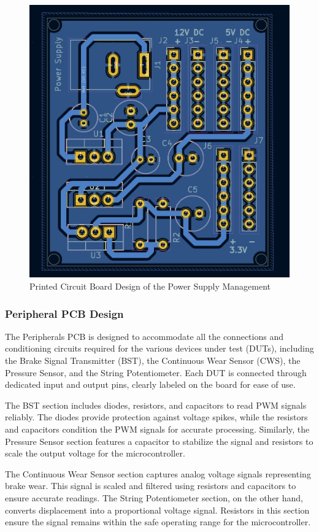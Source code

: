\documentclass[12pt]{article}
\begin{document}
\begin{figure}[H]
  \includegraphics[width=\textwidth]{../assets/pcb/image6.jpg}
  \caption{Printed Circuit Board Design of the Power Supply Management}
\end{figure}
\subsubsection*{Peripheral PCB Design}
The Peripherals PCB is designed to accommodate all the connections and
conditioning circuits required for the various devices under test (DUTs),
including the Brake Signal Transmitter (BST), the Continuous Wear Sensor (CWS),
the Pressure Sensor, and the String Potentiometer. Each DUT is connected
through dedicated input and output pins, clearly labeled on the board for ease
of use.

The BST section includes diodes, resistors, and capacitors to read PWM signals
reliably. The diodes provide protection against voltage spikes, while the
resistors and capacitors condition the PWM signals for accurate processing.
Similarly, the Pressure Sensor section features a capacitor to stabilize the
signal and resistors to scale the output voltage for the microcontroller.

The Continuous Wear Sensor section captures analog voltage signals representing
brake wear. This signal is scaled and filtered using resistors and capacitors
to ensure accurate readings. The String Potentiometer section, on the other
hand, converts displacement into a proportional voltage signal. Resistors in
this section ensure the signal remains within the safe operating range for the
microcontroller.
\end{document}
